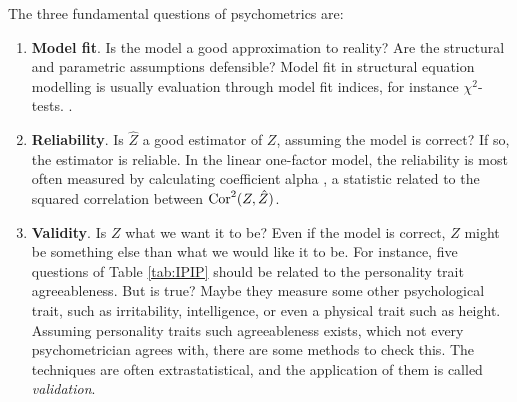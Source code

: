 The three fundamental questions of psychometrics are:
\begin{enumerate}
\item \textbf{Model fit}. Is the model a good approximation to reality? Are the structural and parametric assumptions defensible? Model fit in structural equation modelling is usually evaluation through model fit indices, for instance $\chi^{2}$-tests. \parencite[Chapter 15]{Mulaik2009-gc}.
\item \textbf{Reliability}. Is $\hat{Z}$ a good estimator of $Z$, assuming the model is correct? If so, the estimator is reliable. In the linear one-factor model, the reliability is most often measured by calculating coefficient alpha \parencite{Cronbach1951-in}, a statistic related to the squared correlation between $\operatorname{Cor}^{2}(Z,\hat{Z})$.
\item \textbf{Validity}. Is $Z$ what we want it to be? Even if the model is correct, $Z$ might be something else than what we would like it to be. For instance, five questions of Table \ref{tab:IPIP} should be related to the personality trait agreeableness. But is true? Maybe they measure some other psychological trait, such as irritability, intelligence, or even a physical trait such as height. Assuming personality traits such agreeableness exists, which not every psychometrician agrees with, there are some methods to check this. The techniques are often extrastatistical, and the application of them is called \emph{validation}. \parencite[Chapter 6]{Borsboom2005-iq}
\end{enumerate}